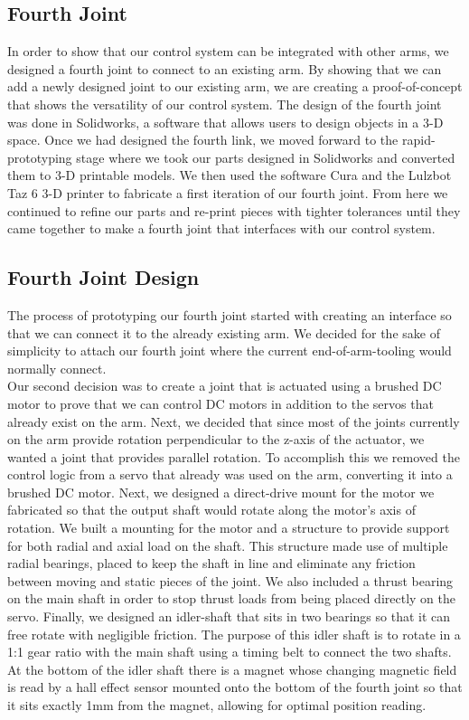 \subsection{Fourth Joint}
In order to show that our control system can be integrated with other arms, we designed a fourth joint to connect to an existing arm. By showing that we can add a newly designed joint to our existing arm, we are creating a proof-of-concept that shows the versatility of our control system.  The design of the fourth joint was done in Solidworks, a software that allows users to design objects in a 3-D space. Once we had designed the fourth link, we moved forward to the rapid-prototyping stage where we took our parts designed in Solidworks and converted them to 3-D printable models.  We then used the software Cura and the Lulzbot Taz 6 3-D printer to fabricate a first iteration of our fourth joint.  From here we continued to refine our parts and re-print pieces with tighter tolerances until they came together to make a fourth joint that interfaces with our control system.  

\subsection{Fourth Joint Design}
The process of prototyping our fourth joint started with creating an interface so that we can connect it to the already existing arm.  We decided for the sake of simplicity to attach our fourth joint where the current end-of-arm-tooling would normally connect. \\
\newline
Our second decision was to create a joint that is actuated using a brushed DC motor to prove that we can control DC motors in addition to the servos that already exist on the arm.  Next, we decided that since most of the joints currently on the arm provide rotation perpendicular to the z-axis of the actuator, we wanted a joint that provides parallel rotation.  To accomplish this we removed the control logic from a servo that already was used on the arm, converting it into a brushed DC motor.  Next, we designed a direct-drive mount for the motor we fabricated so that the output shaft would rotate along the motor's axis of rotation.  We built a mounting for the motor and a structure to provide support for both radial and axial load on the shaft.  This structure made use of multiple radial bearings, placed to keep the shaft in line and eliminate any friction between moving and static pieces of the joint.  We also included a thrust bearing on the main shaft in order to stop thrust loads from being placed directly on the servo.  Finally, we designed an idler-shaft that sits in two bearings so that it can free rotate with negligible friction. The purpose of this idler shaft is to rotate in a 1:1 gear ratio with the main shaft using a timing belt to connect the two shafts.  At the bottom of the idler shaft there is a magnet whose changing magnetic field is read by a hall effect sensor mounted onto the bottom of the fourth joint so that it sits exactly 1mm from the magnet, allowing for optimal position reading.  \\

